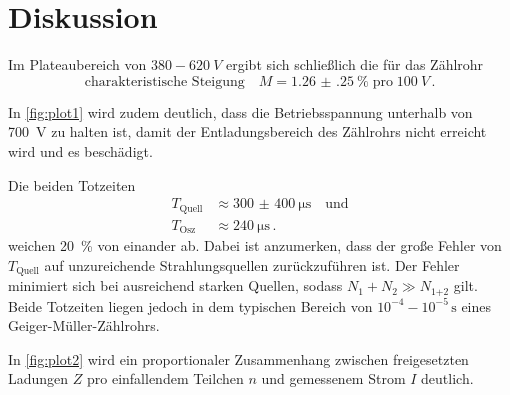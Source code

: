 \section{Diskussion}
\label{sec:Diskussion}

Im Plateaubereich von $380 - \qty{620}{V}$ ergibt sich schließlich die für das Zählrohr 
\begin{equation*}
    \text{charakteristische Steigung} \quad
    M = \qty{1.26(25)}{\percent} \; \text{pro} \; \qty{100}{V} \, .
\end{equation*}

In \autoref{fig:plot1} wird zudem deutlich, dass die Betriebsspannung unterhalb von \qty{700}{V}
zu halten ist, damit der Entladungsbereich des Zählrohrs nicht erreicht wird und es beschädigt.

Die beiden Totzeiten
\begin{align*}
    T_\text{Quell} &\approx \qty{300(400)}{\micro\second} \quad \text{und} \\
    T_\text{Osz} &\approx \qty{240}{\micro\second} \, .
\end{align*}
weichen \qty{20}{\percent} von einander ab.
Dabei ist anzumerken, dass der große Fehler von $T_\text{Quell}$ auf unzureichende Strahlungsquellen zurückzuführen ist.
Der Fehler minimiert sich bei ausreichend starken Quellen, 
sodass $N_\text{1} + N_\text{2} \gg N_\text{1+2}$ gilt.
Beide Totzeiten liegen jedoch in dem typischen Bereich von $10^{-4} - 10^{-5} \, \unit{\second}$ eines Geiger-Müller-Zählrohrs.

In \autoref{fig:plot2} wird ein proportionaler Zusammenhang zwischen
freigesetzten Ladungen $Z$ pro einfallendem Teilchen $n$ und gemessenem Strom $I$ deutlich.